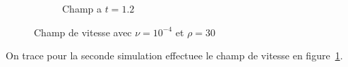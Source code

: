 \documentclass{article}
\begin{document}
\begin{figure}
\begin{subfigure}{0.3\textwidth}
		\caption{Champ a $t=1.2$}
	\end{subfigure}
	\caption{Champ de vitesse avec $\nu=10^{-4}$ et $\rho=30$}\label{fig:field}
\end{figure}
On trace pour la seconde simulation effectuee le champ de vitesse en figure~\ref{fig:field}.

\begin{appendix}
  \listoffigures
\end{appendix}
\end{document}
